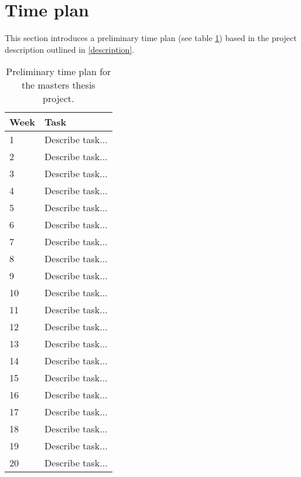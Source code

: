 \section{Time plan}

This section introduces a preliminary time plan (see table \ref{timeline:time_plan}) based in the project description outlined in \ref{description}.

\begin{table}[ht]
  \centering
  \begin{tabularx}{\textwidth}{|l|X|}
    \hline
    Week & Task \\
    \hline
    1 & Describe task... \\
    2 & Describe task... \\
    3 & Describe task... \\
    4 & Describe task... \\
    5 & Describe task... \\
    6 & Describe task... \\
    7 & Describe task... \\
    8 & Describe task... \\
    9 & Describe task... \\
    10 & Describe task... \\
    11 & Describe task... \\
    12 & Describe task... \\
    13 & Describe task... \\
    14 & Describe task... \\
    15 & Describe task... \\
    16 & Describe task... \\
    17 & Describe task... \\
    18 & Describe task... \\
    19 & Describe task... \\
    20 & Describe task... \\
    \hline
  \end{tabularx}
  \caption{Preliminary time plan for the masters thesis project.}
  \label{timeline:time_plan}
\end{table}